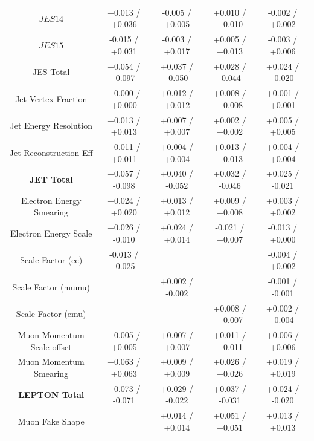 \begin{table}[htbp]
\begin{center}
\begin{tabular}{|c|c|c|c|c|}
   $JES {14}$                          &  +0.013   / +0.036   & -0.005   / +0.005   & +0.010   / +0.010   & -0.002   / +0.002   \\
   $JES {15}$                          &  -0.015   / +0.031   & -0.003   / +0.017   & +0.005   / +0.013   & -0.003   / +0.006   \\
   \hline
   JES Total                             &  +0.054   / -0.097   & +0.037   / -0.050   & +0.028   / -0.044   & +0.024   / -0.020   \\
   Jet Vertex Fraction                   &  +0.000    / +0.000    & +0.012   / +0.012   & +0.008   / +0.008   & +0.001   / +0.001   \\
   Jet Energy Resolution                 &  +0.013   / +0.013   & +0.007   / +0.007   & +0.002   / +0.002   & +0.005   / +0.005   \\
   Jet Reconstruction Eff                &  +0.011   / +0.011   & +0.004   / +0.004   & +0.013   / +0.013   & +0.004   / +0.004   \\
   \hline
   \textbf{JET Total}                    &  +0.057   / -0.098   & +0.040   / -0.052   & +0.032   / -0.046   & +0.025   / -0.021   \\
   \hline
   Electron Energy Smearing              &  +0.024   / +0.020   & +0.013   / +0.012   & +0.009   / +0.008   & +0.003   / +0.002   \\
   Electron Energy Scale                 &  +0.026   / -0.010   & +0.024   / +0.014   & -0.021   / +0.007   & -0.013   / +0.000    \\
   Scale Factor (ee)                     &  -0.013   / -0.025   &         &      & -0.004   / +0.002   \\
   Scale Factor (mumu)                   &       & +0.002   / -0.002   &     & -0.001   / -0.001   \\
   Scale Factor (emu)                    &       &     & +0.008   / +0.007   & +0.002   / -0.004   \\
   Muon Momentum Scale offset            &  +0.005   / +0.005   & +0.007   / +0.007   & +0.011   / +0.011   & +0.006   / +0.006   \\
   Muon Momentum Smearing                &  +0.063   / +0.063   & +0.009   / +0.009   & +0.026   / +0.026   & +0.019   / +0.019   \\
   \hline
   \textbf{LEPTON Total}                 &  +0.073   / -0.071   & +0.029   / -0.022   & +0.037   / -0.031   & +0.024   / -0.020   \\
   \hline
   Muon Fake Shape                       &        & +0.014   / +0.014   & +0.051   / +0.051   & +0.013   / +0.013   \\

\end{tabular}
\end{center}
\end{table}
